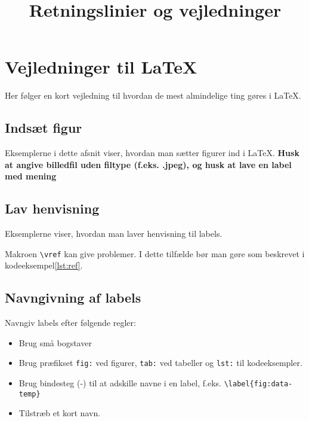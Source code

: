 \documentclass[simple,final]{../mypaper}
\title{Retningslinier og vejledninger}
\begin{document}
\maketitle

\tableofcontents*


\chapter{Vejledninger til \LaTeX}

Her følger en kort vejledning til hvordan de mest almindelige ting
gøres i \LaTeX .

\section{Indsæt figur}

Eksemplerne i dette afsnit viser, hvordan man sætter figurer ind i
\LaTeX . \textbf{Husk at angive billedfil uden filtype (f.eks. .jpeg),
  og husk at lave en label med mening}






\section{Lav henvisning}

Eksemplerne viser, hvordan man laver henvisning til labels.



Makroen \texttt{\textbackslash vref} kan give problemer. I dette tilfælde
bør man gøre som beskrevet i kodeeksempel\vref{lst:ref}.




\section{Navngivning af labels}

Navngiv labels efter følgende regler:

\begin{itemize}
\item Brug små bogstaver
\item Brug præfikset \texttt{fig:} ved figurer, \texttt{tab:} ved
  tabeller og \texttt{lst:} til kodeeksempler.
\item Brug bindesteg (-) til at adskille navne i en label,
  f.eks. \texttt{\textbackslash label\{fig:data-temp\}}
\item Tilstræb et kort navn.
\end{itemize}
\end{document}
